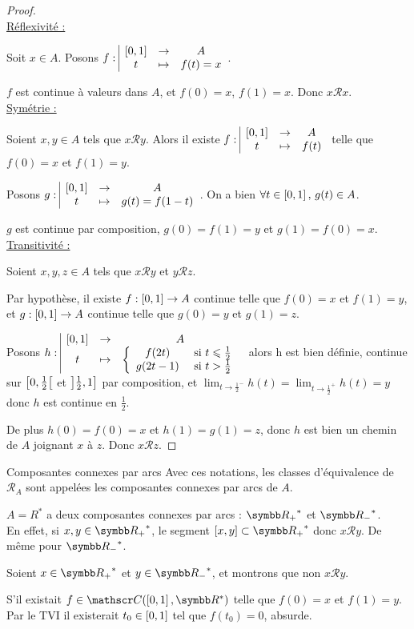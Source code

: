 \begin{proof}~\\
    \uline{Réflexivité :}

    \svspace Soit $x \in A$. Posons $f: \space \begin{array}{|ccc} \displaystyle \left[0, 1\right] & \to & \displaystyle A \\ \displaystyle t & \mapsto & \displaystyle f(t) = x \end{array}$. 

    $f$ est continue à valeurs dans $A$, et $f(0) = x$, $f(1) = x$. Donc $x \mathcal R x$.\\

    \uline{Symétrie :}

    Soient $x, y \in A$ tels que $x \mathcal R y$. Alors il existe $f: \space \begin{array}{|ccc} \displaystyle \left[0, 1\right] & \to & \displaystyle A \\ \displaystyle t & \mapsto & \displaystyle f(t) \end{array}$
    telle que $f(0) = x$ et $f(1) = y$.

    Posons $g: \space \begin{array}{|ccc} \displaystyle \left[0, 1\right] & \to & \displaystyle A \\ \displaystyle t & \mapsto & \displaystyle g(t) = f(1 - t) \end{array}$. On a bien $\forall t \in \left[0, 1\right], \, g(t) \in A$. 

    $g$ est continue par composition, $g(0) = f(1) = y$ et $g(1) = f(0) = x$. \\

    \uline{Transitivité :}

    Soient $x, y, z \in A$ tels que $x \mathcal R y$ et $y \mathcal R z$.

    Par hypothèse, il existe $f : \left[0, 1\right] \to A$ continue telle que $f(0) = x$ et $f(1) = y$, 
    et $g : \left[0, 1\right] \to A$ continue telle que $g(0) = y$ et $g(1) = z$.

    Posons $h: \space \begin{array}{|ccc} \displaystyle \left[0, 1\right] & \to & \displaystyle A \\ \displaystyle t & \mapsto & \displaystyle  \left\{ \begin{array}{cc} 
        f(2t) & \text{ si } t \leqslant \frac 1 2 \\
        g(2t - 1) & \text{ si } t > \frac 1 2
    \end{array} \right.  \end{array}$ alors h est bien définie, continue sur $\left[0, \frac 1 2\right[$ et $\left]\frac 1 2, 1\right]$ par 
    composition, et $\displaystyle \lim_{t \to \frac 1 2^-} h(t) = \lim_{t \to \frac 1 2^+} h(t) = y$ donc $h$ est continue en $\frac 1 2$.

    De plus $h(0) = f(0) = x$ et $h(1) = g(1) = z$, donc $h$ est bien un chemin de 
    $A$ joignant $x$ à $z$. Donc $x \mathcal R z$.
\end{proof}

\begin{definition}{Composantes connexes par arcs}{}
    Avec ces notations, les classes d'équivalence de $\mathcal R_A$ sont appelées 
    les composantes connexes par arcs de $A$.
\end{definition}

\begin{exemple}
    $A = R^*$ a deux composantes connexes par arcs : ${\R_+}^*$ et ${\R_-}^*$. \\

    En effet, si $x, y \in {\R_+}^*$, le segment $[x, y] \subset {\R_+}^*$ donc $x \mathcal R y$.
    De même pour ${\R_-}^*$.

    Soient $x \in {\R_+}^*$ et $y \in {\R_-}^*$, et montrons que non $x \mathcal{R} y$.

    S'il existait $f \in \mathscr C(\inter 0 1, \R^*)$ telle que $f(0) = x$ et $f(1) = y$.
    Par le TVI il existerait $t_0 \in \left[0, 1\right]$ tel que $f(t_0) = 0$, absurde.
\end{exemple}

